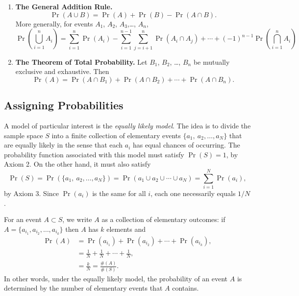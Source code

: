 \documentclass[captions=tableheading]{scrbook}
\begin{document}
\begin{enumerate}
\item \textbf{The General Addition Rule.}
  \begin{equation}
  \Pr(A\cup B)=\Pr(A)+\Pr(B)-\Pr(A\cap B).\label{eq-general-addition-rule-1}
  \end{equation}
  More generally, for events \(A_{1}\), \(A_{2}\), \(A_{3}\),\ldots{}, \(A_{n}\),
  \begin{equation}
  \Pr\left(\bigcup_{i=1}^{n}A_{i}\right)=\sum_{i=1}^{n}\Pr(A_{i})-\sum_{i=1}^{n-1}\sum_{j=i+1}^{n}\Pr(A_{i}\cap A_{j})+\cdots+(-1)^{n-1}\Pr\left(\bigcap_{i=1}^{n}A_{i}\right)
  \end{equation}
\item \textbf{The Theorem of Total Probability.} 
  Let \(B_{1}\), \(B_{2}\), \ldots{}, \(B_{n}\) be mutually exclusive and exhaustive. Then
  \begin{equation}
  \Pr(A)=\Pr(A\cap B_{1})+\Pr(A\cap B_{2})+\cdots+\Pr(A\cap B_{n}).\label{eq-theorem-total-probability}
  \end{equation}
\end{enumerate}
\subsection{Assigning Probabilities}
\label{sec-4-4-3}


A model of particular interest is the \emph{equally likely model}. The idea is to divide the sample space \(S\) into a finite collection of elementary events \( \{ a_{1},\ a_{2}, \ldots, a_{N} \} \) that are equally likely in the sense that each \(a_{i}\) has equal chances of occurring. The probability function associated with this model must satisfy \(\Pr(S)=1\), by Axiom 2. On the other hand, it must also satisfy
\[
\Pr(S)=\Pr( \{ a_{1},\ a_{2},\ldots,a_{N} \} )=\Pr(a_{1}\cup a_{2}\cup\cdots\cup a_{N})=\sum_{i=1}^{N}\Pr(a_{i}),
\]
by Axiom 3. Since \(\Pr(a_{i})\) is the same for all \(i\), each one necessarily equals \(1/N\). 

For an event \(A\subset S\), we write \(A\) as a collection of elementary outcomes: if \( A = \{ a_{i_{1}}, a_{i_{2}}, \ldots, a_{i_{k}} \} \) then \(A\) has \(k\) elements and 
\begin{align*}
\Pr(A) & =\Pr(a_{i_{1}})+\Pr(a_{i_{2}})+\cdots+\Pr(a_{i_{k}}),\\
 & =\frac{1}{N}+\frac{1}{N}+\cdots+\frac{1}{N},\\  & =\frac{k}{N}=\frac{\#(A)}{\#(S)}.
\end{align*}
In other words, under the equally likely model, the probability of an event \(A\) is determined by the number of elementary events that \(A\) contains. 
\end{document}
